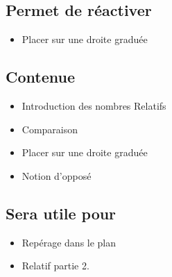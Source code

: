 \subsection{Permet de réactiver}
\begin{itemize}
    \item Placer sur une droite graduée
\end{itemize}

\subsection{Contenue}
\begin{itemize}
    \item Introduction des nombres Relatifs
    \item Comparaison
    \item Placer sur une droite graduée
    \item Notion d'opposé
\end{itemize}

\subsection{Sera utile pour}
\begin{itemize}
    \item Repérage dans le plan
    \item Relatif partie 2.
\end{itemize}